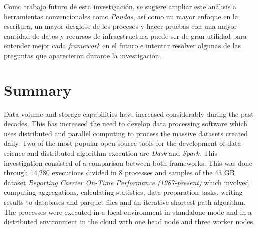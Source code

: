 \documentclass[11pt, oneside]{book}
\begin{document}
Como trabajo futuro de esta investigación, se sugiere ampliar este análisis a herramientas convencionales como \textit{Pandas}, así como un mayor enfoque en la escritura, un mayor desglose de los procesos y hacer pruebas con una mayor cantidad de datos y recursos de infraestructura puede ser de gran utilidad para entender mejor cada \textit{framework} en el futuro e intentar resolver algunas de las preguntas que aparecieron durante la investigación.

\pagestyle{plain}

\noindent 


\chapter*{Summary}

\noindent Data volume and storage capabilities have increased considerably during the past decades. This has increased the need to develop data processing software which uses distributed and parallel computing to process the massive datasets created daily. Two of the most popular open-source tools for the development of data science and distributed algorithm execution are \textit{Dask} and \textit{Spark}. This investigation consisted of a comparison between both frameworks. This was done through 14,280 executions divided in 8 processes and samples of the 43 GB dataset \textit{Reporting Carrier On-Time Performance (1987-present)} which involved computing aggregations, calculating statistics, data preparation tasks, writing results to databases and parquet files and an iterative shortest-path algorithm. The processes were executed in a local environment in standalone mode and in a distributed environment in the cloud with one head node and three worker nodes.
\end{document}
